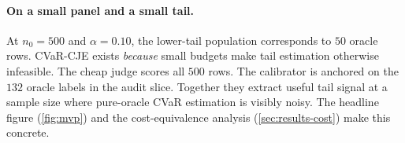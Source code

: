 \paragraph{On a small panel and a small tail.}
At $n_0 = 500$ and $\alpha = 0.10$, the lower-tail population
corresponds to $50$ oracle rows. CVaR-CJE exists \emph{because} small
budgets make tail estimation otherwise infeasible. The cheap judge
scores all $500$ rows. The calibrator is anchored on the $132$ oracle
labels in the audit slice. Together they extract useful tail signal at
a sample size where pure-oracle CVaR estimation is visibly noisy. The
headline figure (\cref{fig:mvp}) and the cost-equivalence analysis
(\cref{sec:results-cost}) make this concrete.
